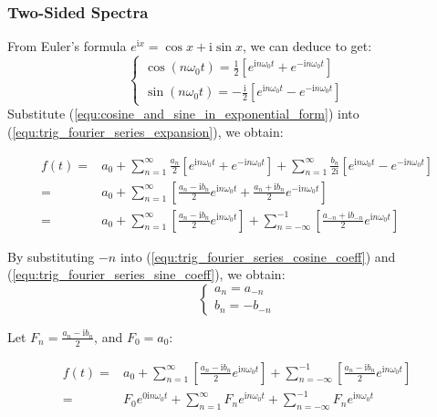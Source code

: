 \subsubsection{Two-Sided Spectra}
From Euler's formula $e^{\mathrm{i}x}=\cos{x}+\mathrm{i}\sin{x}$, we can deduce to get:
\begin{equation}
    \begin{cases}
        \cos(n\omega_0t) = \frac{1}{2}\left[e^{\mathrm{i}n\omega_0t}+e^{-\mathrm{i}n\omega_0t}\right]   \\
        \sin(n\omega_0t) = -\frac{\mathrm{i}}{2}\left[e^{\mathrm{i}n\omega_0t}-e^{-\mathrm{i}n\omega_0t}\right]
    \end{cases}
    \label{equ:cosine_and_sine_in_exponential_form}
\end{equation}
Substitute ({\ref{equ:cosine_and_sine_in_exponential_form}}) into ({\ref{equ:trig_fourier_series_expansion}}), 
we obtain:

$$\begin{aligned} f(t) =& a_0 + 
\sum_{n=1}^{\infty}\frac{a_n}{2}\left[e^{\mathrm{i}n\omega_0t}+e^{-\mathrm{i}n\omega_0t}\right]
+ \sum_{n=1}^{\infty}\frac{b_n}{2\mathrm{i}}\left[e^{\mathrm{i}n\omega_0t}-e^{-\mathrm{i}n\omega_0t}\right] \\
=& a_0 + \sum_{n=1}^{\infty}\left[ \frac{a_n-\mathrm{i}b_n}{2}e^{\mathrm{i}n\omega_0t} 
+ \frac{a_n+\mathrm{i}b_n}{2}e^{-\mathrm{i}n\omega_0t}\right]   \\
=& a_0 + \sum_{n=1}^{\infty}\left[ \frac{a_n-\mathrm{i}b_n}{2}e^{\mathrm{i}n\omega_0t} \right]
+ \sum_{n=-\infty}^{-1}\left[\frac{a_{-n}+\mathrm{i}b_{-n}}{2}e^{\mathrm{i}n\omega_0t}\right]
\end{aligned}$$

By substituting $-n$ into (\ref{equ:trig_fourier_series_cosine_coeff}) and 
(\ref{equ:trig_fourier_series_sine_coeff}), we obtain:
\begin{equation}\begin{cases}
    a_n = a_{-n}    \\
    b_n = -b_{-n}
\end{cases}
\label{equ:coeff_of_negative_n_relationship}
\end{equation}

Let $F_n=\frac{a_n-\mathrm{i}b_n}{2}$, and $F_0=a_0$:

$$\begin{aligned} f(t) =& a_0 + 
    \sum_{n=1}^{\infty}\left[ \frac{a_n-\mathrm{i}b_n}{2}e^{\mathrm{i}n\omega_0t} \right]
    + \sum_{n=-\infty}^{-1}\left[\frac{a_n-\mathrm{i}b_n}{2}e^{\mathrm{i}n\omega_0t}\right] \\
    =& F_0e^{0\mathrm{i}n\omega_0t} + 
    \sum_{n=1}^{\infty}F_ne^{\mathrm{i}n\omega_0t}
    + \sum_{n=-\infty}^{-1}F_ne^{\mathrm{i}n\omega_0t}
\end{aligned}$$

